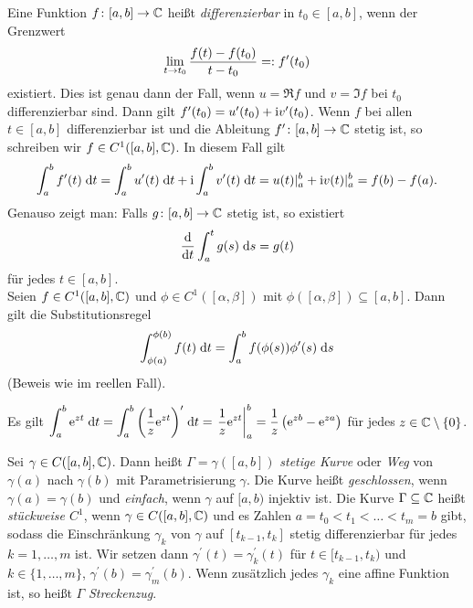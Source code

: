 \documentclass[a4paper,twoside,DIV15,BCOR12mm]{scrbook}
\begin{document}
\noindent Eine Funktion $f\colon[a,b]\to\mathbb{C}$ heißt \emph{differenzierbar} in $t_0\in[a,b]$, wenn der Grenzwert \[\lim_{t\to t_0}{\frac{f(t)-f(t_0)}{t-t_0}} =: f^\prime(t_0)\] existiert. Dies ist genau dann der Fall, wenn $u=\Re{f}$ und $v=\Im{f}$ bei $t_0$ differenzierbar sind. Dann gilt $f^\prime(t_0) = u^\prime(t_0) + \mathrm{i} v^\prime(t_0)$. Wenn $f$ bei allen $t\in[a,b]$ differenzierbar ist und die Ableitung $f^\prime\colon[a,b]\to\mathbb{C}$ stetig ist, so schreiben wir $f\in C^1([a,b],\mathbb{C})$. In diesem Fall gilt
\begin{equation}\label{2.1}
\int_{a}^{b}{f^\prime(t)}\;\mathrm{d} t = \int_{a}^{b}{u^\prime(t)}\;\mathrm{d} t + \mathrm{i}\int_{a}^{b}{v^\prime(t)}\;\mathrm{d} t = u(t)\vert_a^b + \mathrm{i} v(t)\vert_a^b = f(b) - f(a).
\end{equation}
Genauso zeigt man: Falls $g\colon[a,b]\to\mathbb{C}$ stetig ist, so existiert
\begin{equation}\label{2.2}
\frac{\mathrm{d}}{\mathrm{d} t} \int_{a}^{t}{g(s)}\;\mathrm{d} s = g(t)
\end{equation}
für jedes $t\in[a,b]$.\\
Seien $f\in C^1([a,b],\mathbb{C})$ und $\phi\in C^1([\alpha,\beta])$ mit $\phi([\alpha,\beta])\subseteq[a,b]$. Dann gilt die Substitutionsregel
\begin{equation}\label{2.3}
  \int_{\phi(a)}^{\phi(b)}{f(t)}\;\mathrm{d} t = \int_{a}^{b}{f(\phi(s))\phi^\prime(s)}\;\mathrm{d} s
\end{equation}
(Beweis wie im reellen Fall).

\begin{bsp} \label{bsp2.1}
Es gilt $\displaystyle\int_{a}^{b}{\mathrm{e}^{zt}}\;\mathrm{d} t = \int_{a}^{b}{\left(\frac1z \mathrm{e}^{zt}\right)^\prime}\;\mathrm{d} t = \left.\frac1z
  \mathrm{e}^{zt} \right\vert_a^b = \frac1z\left(\mathrm{e}^{zb}-\mathrm{e}^{za}\right)$ für jedes $z\in\mathbb{C}\setminus\{0\}$.
\end{bsp}

\begin{dfn} \label{dfn2.2}
Sei $\gamma\in C([a,b],\mathbb{C})$. Dann heißt $\Gamma=\gamma([a,b])$ \emph{stetige Kurve} oder \emph{Weg} von $\gamma(a)$ nach $\gamma(b)$ mit Parametrisierung $\gamma$. Die Kurve heißt \emph{geschlossen}, wenn $\gamma(a)=\gamma(b)$ und \emph{einfach}, wenn $\gamma$ auf $[a,b)$ injektiv ist. Die Kurve $\Gamma\subseteq\mathbb{C}$ heißt \emph{stückweise $C^1$}, wenn $\gamma\in C([a,b],\mathbb{C})$ und es Zahlen $a=t_0<t_1<\dotso<t_m=b$ gibt, sodass die Einschränkung $\gamma_k$ von $\gamma$ auf $[t_{k-1},t_k]$ stetig differenzierbar für jedes $k=1,\dotsc,m$ ist. Wir setzen dann $\gamma^\prime(t)=\gamma_k^\prime(t)$ für $t\in[t_{k-1},t_k)$ und $k\in\{1,\dotsc,m\}$, $\gamma^\prime(b)=\gamma_m^\prime(b)$. Wenn zusätzlich jedes $\gamma_k$ eine affine Funktion ist, so heißt $\Gamma$ \emph{Streckenzug}.
\end{dfn}
\end{document}
